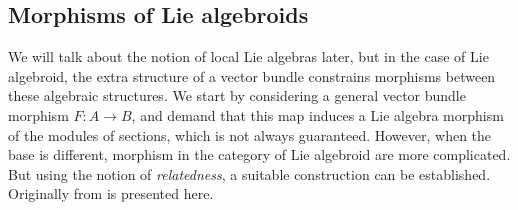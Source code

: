 \subsection{Morphisms of Lie algebroids} %
\label{sub:morphisms_of_la}

We will talk about the notion of local Lie algebras later, but in the case of Lie algebroid, the extra structure of a vector bundle constrains morphisms between these algebraic structures.
We start by considering a general vector bundle morphism $F: A \rightarrow B$, and demand that this map induces a Lie algebra morphism of the modules of sections, which is not always guaranteed.
% 
\label{def:morphism of Lie algebroids over same base}
% 
However, when the base is different, morphism in the category of Lie algebroid are more complicated. 
But using the notion of \textit{relatedness}, a suitable construction can be established.
Originally from \citep{Higgins1990} is presented here.

% 
